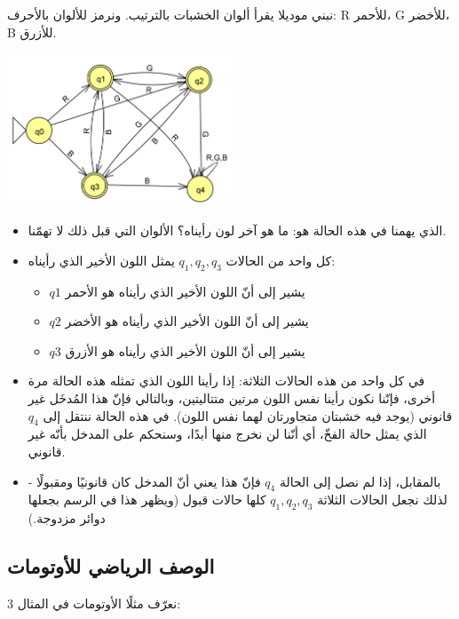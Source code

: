 \documentclass[12pt]{article}
\begin{document}
نبني موديلا يقرأ ألوان الخشبات بالترتيب. ونرمز للألوان بالأحرف: R للأحمر، G للأخضر، B للأزرق.

\begin{center}
\includegraphics[width=0.5\textwidth]{../../../images/DFAs/03_color_series_dfa.png}
\end{center}

\begin{itemize}
    \item الذي يهمنا في هذه الحالة هو: ما هو آخر لون رأيناه؟ الألوان التي قبل ذلك لا تهمّنا.
    \item كل واحد من الحالات $q_1, q_2, q_3$ يمثل اللون الأخير الذي رأيناه:
    \begin{itemize}
        \item $q1$ يشير إلى أنّ اللون الأخير الذي رأيناه هو الأحمر
        \item $q2$ يشير إلى أنّ اللون الأخير الذي رأيناه هو الأخضر
        \item $q3$ يشير إلى أنّ اللون الأخير الذي رأيناه هو الأزرق
    \end{itemize}
    \item في كل واحد من هذه الحالات الثلاثة: إذا رأينا اللون الذي تمثله هذه الحالة مرة أخرى، فإنّنا نكون رأينا نفس اللون مرتين متتاليتين، وبالتالي فإنّ هذا المُدخَل غير قانوني (يوجد فيه خشبتان متجاورتان لهما نفس اللون).
    في هذه الحالة ننتقل إلى $q_4$ الذي يمثل حالة الفخّ، أي أنّنا لن نخرج منها أبدًا، وسنحكم على المدخل بأنّه غير قانوني.
    \item بالمقابل، إذا لم نصل إلى الحالة $q_4$ فإنّ هذا يعني أنّ المدخل كان قانونيًا ومقبولًا - لذلك نجعل الحالات الثلاثة $q_1, q_2, q_3$ كلها حالات قبول (ويظهر هذا في الرسم بجعلها دوائر مزدوجة.)
\end{itemize}


\subsection{الوصف الرياضي للأوتومات}

نعرّف مثلًا الأوتومات في المثال 3:
\end{document}

